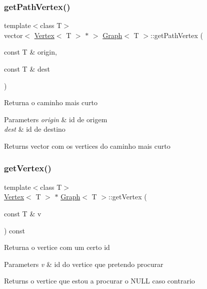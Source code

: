 \subsubsection{\texorpdfstring{get\+Path\+Vertex()}{getPathVertex()}}
{\footnotesize\ttfamily template$<$class T$>$ \\
vector$<$ \mbox{\hyperlink{class_vertex}{Vertex}}$<$ T $>$ $\ast$ $>$ \mbox{\hyperlink{class_graph}{Graph}}$<$ T $>$\+::get\+Path\+Vertex (\begin{DoxyParamCaption}\item[{const T \&}]{origin,  }\item[{const T \&}]{dest }\end{DoxyParamCaption})}

Returna o caminho mais curto 
\begin{DoxyParams}{Parameters}
{\em origin} & id de origem \\
\hline
{\em dest} & id de destino \\
\hline
\end{DoxyParams}
\begin{DoxyReturn}{Returns}
vector com os vertices do caminho mais curto 
\end{DoxyReturn}
\mbox{\label{class_graph_a67453d232f04e85c642b51554df1bc6a}} 
\subsubsection{\texorpdfstring{get\+Vertex()}{getVertex()}}
{\footnotesize\ttfamily template$<$class T$>$ \\
\mbox{\hyperlink{class_vertex}{Vertex}}$<$ T $>$ $\ast$ \mbox{\hyperlink{class_graph}{Graph}}$<$ T $>$\+::get\+Vertex (\begin{DoxyParamCaption}\item[{const T \&}]{v }\end{DoxyParamCaption}) const}

Returna o vertice com um certo id 
\begin{DoxyParams}{Parameters}
{\em v} & id do vertice que pretendo procurar \\
\hline
\end{DoxyParams}
\begin{DoxyReturn}{Returns}
o vertice que estou a procurar o N\+U\+LL caso contrario 
\end{DoxyReturn}
\mbox{\label{class_graph_a923b43995f81ad9319bbc81a1e433e64}} 
